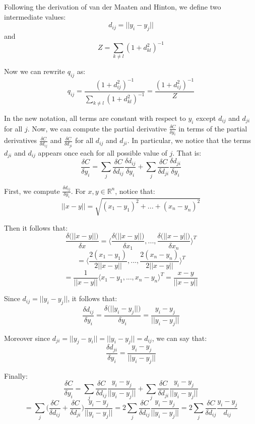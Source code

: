 \documentclass[a4paper]{article}
\begin{document}
\begin{enumerate}
{Following the derivation of van der Maaten and Hinton, we define two intermediate values:
$$d_{ij} = ||y_i - y_j || $$
and 
$$Z = \sum_{k \neq l} (1 + d_{kl}^2)^{-1} $$

Now we can rewrite $q_{ij}$ as:
$$q_{ij} = \frac{(1+d_{ij}^2)^{-1} }{ \sum_{k \neq l} (1 + d_{kl}^2)^{-1} } = \frac{(1+d_{ij}^2)^{-1} }{  Z }$$

In the new notation, all terms are constant with respect to $y_i$ except $d_{ij}$ and $d_{ji}$ for all $j$. Now, we can compute the partial derivative $\frac{\delta C }{\delta y_i}$ in terms of the partial derivatives $\frac{\delta C }{\delta d_{ij}}$ and $\frac{\delta C }{\delta d_{ji}}$ for all $d_{ij}$ and $d_{ji}$. 
In particular, we notice that the terms $d_{ji}$ and $d_{ij}$ appears once each for all possible value of $j$. That is:
$$\frac{\delta C }{\delta y_i} = \sum_j  \frac{\delta C }{\delta d_{ij}} \frac{\delta d_{ij} }{\delta y_{i}} + \sum_j  \frac{\delta C }{\delta d_{ji}} \frac{\delta d_{ji} }{\delta y_{i}} $$

First, we compute $\frac{\delta d_{ij} }{\delta y_{i}}$. For $x,y \in \mathbb{R}^n$, notice that:
$$ ||x - y || =  \sqrt{ (x_{1}-y_{1})^2 + ... + (x_{n}-y_{n})^2  } $$

Then it follows that:
$$\frac{\delta \Big( ||x - y || \Big) }{\delta x} = \Big \langle \frac{\delta \Big( ||x - y || \Big) }{\delta x_1}, ..., \frac{\delta \Big( ||x - y || \Big) }{\delta x_n} \Big \rangle^T $$
$$ = \Big \langle \frac{2(x_1 - y_1) }{ 2 ||x-y|| }, ..., \frac{ 2(x_n - y_n)}{ 2 ||x-y|| } \Big \rangle^T $$
$$ = \frac{1}{||x-y||}\Big \langle x_1-y_1, ..., x_n - y_n \Big \rangle ^T = \frac{x-y}{||x-y||} $$

Since $d_{ij} = ||y_i - y_j || $, it follows that:
$$\frac{\delta d_{ij}  }{\delta y_i} = \frac{\delta \Big( ||y_i - y_j || \Big) }{\delta y_i} = \frac{y_i - y_j}{ ||y_i - y_j ||} $$

Moreover since $d_{ji} = ||y_j - y_i || = ||y_i - y_j ||  = d_{ij} $, we can say that: 
$$\frac{\delta d_{ji}  }{\delta y_i} = \frac{y_i - y_j}{ ||y_i - y_j ||} $$

Finally:
$$\frac{\delta C }{\delta y_i} = \sum_j  \frac{\delta C }{\delta d_{ij}} \frac{y_i - y_j}{ ||y_i - y_j ||} + \sum_j  \frac{\delta C }{\delta d_{ji}} \frac{y_i - y_j}{ ||y_i - y_j ||} $$
$$ =  \sum_j  \Big( \frac{\delta C }{\delta d_{ij}} +  \frac{\delta C }{\delta d_{ji}} \Big) \frac{y_i - y_j}{ ||y_i - y_j ||} =  2 \sum_j  \frac{\delta C }{\delta d_{ij}}  \frac{y_i - y_j}{ ||y_i - y_j ||} = 2 \sum_j  \frac{\delta C }{\delta d_{ij}}  \frac{y_i - y_j}{ d_{ij} } $$

}
\end{enumerate}
\end{document}
